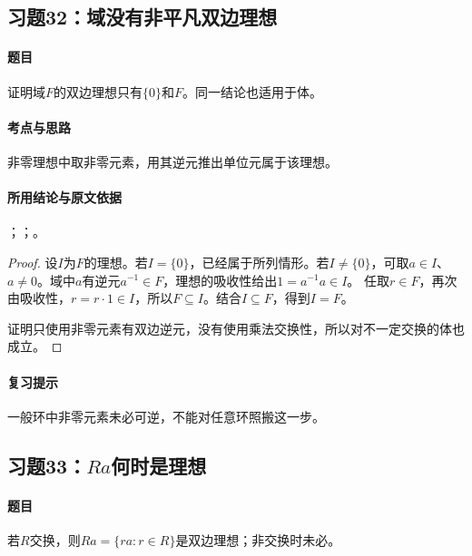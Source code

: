 \subsection{习题32：\texorpdfstring{域没有非平凡双边理想}{域没有非平凡双边理想}}
\label{ex:1:32}

\paragraph{题目}
证明域$F$的双边理想只有$\{0\}$和$F$。同一结论也适用于体。

\paragraph{考点与思路}
非零理想中取非零元素，用其逆元推出单位元属于该理想。

\paragraph{所用结论与原文依据}
；；。


\begin{proof}
设$I$为$F$的理想。若$I=\{0\}$，已经属于所列情形。若$I\ne\{0\}$，可取$a\in I$、$a\ne0$。域中$a$有逆元$a^{-1}\in F$，理想的吸收性给出$1=a^{-1}a\in I$。
任取$r\in F$，再次由吸收性，$r=r\cdot1\in I$，所以$F\subseteq I$。结合$I\subseteq F$，得到$I=F$。

证明只使用非零元素有双边逆元，没有使用乘法交换性，所以对不一定交换的体也成立。
\end{proof}

\paragraph{复习提示}
一般环中非零元素未必可逆，不能对任意环照搬这一步。


\subsection{习题33：\texorpdfstring{$Ra$何时是理想}{Ra何时是理想}}
\label{ex:1:33}

\paragraph{题目}
若$R$交换，则$Ra=\{ra:r\in R\}$是双边理想；非交换时未必。

